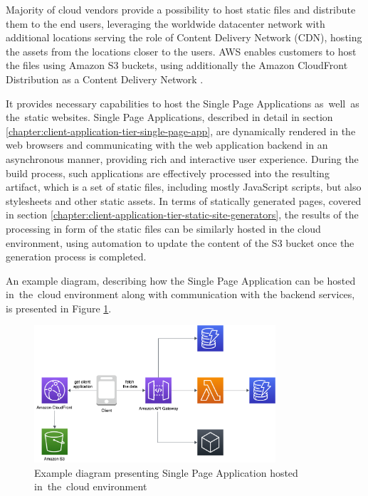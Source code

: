 Majority of cloud vendors provide a possibility to host static files and distribute them to the end users, leveraging the worldwide datacenter network with additional locations serving the role of Content Delivery Network (CDN), hosting the assets from the locations closer to the users.
AWS enables customers to host the files using Amazon S3 buckets, using additionally the Amazon CloudFront Distribution as a Content Delivery Network  \cite{AWSWebHosting}.

It provides necessary capabilities to host the Single Page Applications as~well~as the~static websites.
Single Page Applications, described in detail in section \ref{chapter:client-application-tier-single-page-app}, are dynamically rendered in the web browsers and communicating with the web application backend in an asynchronous manner, providing rich and interactive user experience.
During the build process, such applications are effectively processed into the resulting artifact, which is a set of static files, including mostly JavaScript scripts, but also stylesheets and other static assets.
In terms of statically generated pages, covered in section \ref{chapter:client-application-tier-static-site-generators}, the results of the processing in form of the static files can be similarly hosted in the cloud environment, using automation to update the content of the S3 bucket once the generation process is completed.

An example diagram, describing how the Single Page Application can be hosted in~the~cloud environment along with communication with the backend services, is presented in Figure \ref{fig:pattern-client-hosted}.

\begin{figure}[h]
   \centering
   \includegraphics[width=0.8\textwidth]{assets/04-serverless-for-web-apps/hostedClient.png}
   \caption{Example diagram presenting Single Page Application hosted in~the~cloud environment}
   \label{fig:pattern-client-hosted}
\end{figure}

